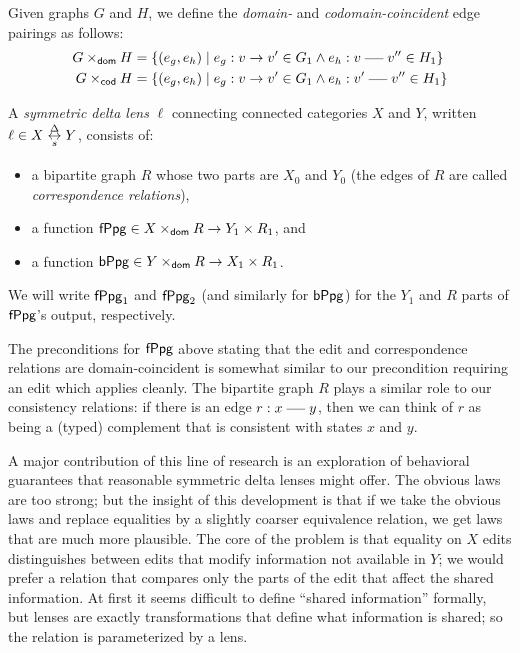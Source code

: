 \begin{definition}
    Given graphs $G$ and $H$, we define the \emph{domain-} and
    \emph{codomain-coincident} edge pairings as follows:
    \begin{align*}
        G \domco H &= \{(e_g,e_h) \mid e_g : v \dedge v' \in G_1 \land e_h :
        v \uedge v'' \in H_1\} \\
        G \codco H &= \{(e_g,e_h) \mid e_g : v \dedge v' \in G_1 \land e_h :
        v' \uedge v'' \in H_1\}
    \end{align*}
\end{definition}

\begin{definition}
    A \emph{symmetric delta lens} $\ell$ connecting connected categories $X$
    and $Y$, written $\ell \in X \sdlens Y$, consists of:
    \begin{itemize}
        \item a bipartite graph $R$ whose two parts are $X_0$ and $Y_0$ (the
            edges of $R$ are called \emph{correspondence relations}),
        \item a function $\mathsf{fPpg} \in X \times_{\mathsf{dom}} R \to Y_1 \times R_1$,
            and
        \item a function $\mathsf{bPpg} \in Y \times_{\mathsf{dom}} R \to X_1 \times R_1$.
    \end{itemize}
    We will write $\mathsf{fPpg}_1$ and $\mathsf{fPpg}_2$ (and similarly for $\mathsf{bPpg}$)
    for the $Y_1$ and $R$ parts of $\mathsf{fPpg}$'s output, respectively.
\end{definition}

The preconditions for $\mathsf{fPpg}$ above stating that the edit and
correspondence relations are domain-coincident is somewhat similar to our
precondition requiring an edit which applies cleanly. The bipartite graph
$R$ plays a similar role to our consistency relations: if there is an edge
$r : x \uedge y$, then we can think of $r$ as being a (typed) complement
that is consistent with states $x$ and $y$.

A major contribution of this line of research is an exploration of
behavioral guarantees that reasonable symmetric delta lenses might offer.
The obvious laws are too strong; but the insight of this development is that
if we take the obvious laws and replace equalities by a slightly coarser
equivalence relation, we get laws that are much more plausible. The core of
the problem is that equality on $X$ edits distinguishes between edits that
modify information not available in $Y$; we would prefer a relation that
compares only the parts of the edit that affect the shared information.
At first it seems difficult to define ``shared information'' formally, but
lenses are exactly transformations that define what information is shared;
so the relation is parameterized by a lens.

